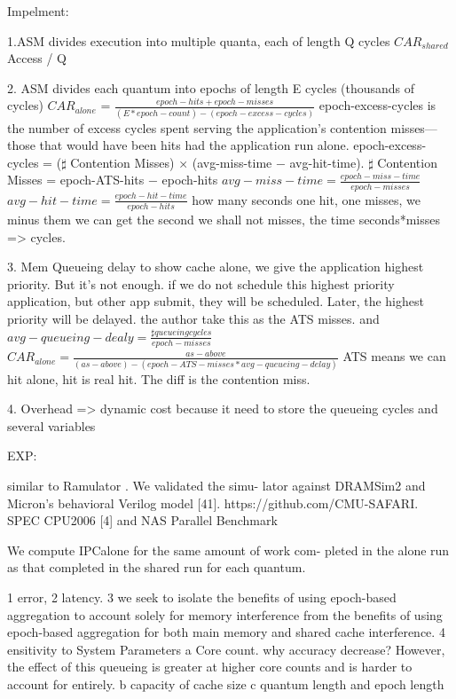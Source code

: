 \documentclass[UTF8]{article}
\begin{document}
Impelment: 

1.ASM divides execution into multiple quanta, each of length Q cycles $ CAR_{shared}$ Access / Q 

2. ASM divides each quantum into epochs of length E cycles (thousands of cycles)  $CAR_{alone}$   = $\frac{epoch-hits + epoch-misses}{(E*epoch-count) - (epoch-excess-cycles)}$   epoch-excess-cycles is the number of excess cycles spent serving the application’s contention misses—those that would have been hits had the application run alone.  epoch-excess-cycles = ($\sharp$ Contention Misses) × (avg-miss-time − avg-hit-time). $\sharp$ Contention Misses = epoch-ATS-hits − epoch-hits $avg-miss-time = \frac{epoch-miss-time}{epoch-misses}$ $avg-hit-time = \frac{epoch-hit-time}{epoch-hits}$ how many seconds one hit, one misses, we minus them we can get the second we shall not misses, the time seconds*misses => cycles. 

3. Mem Queueing delay to show cache alone, we give the application highest priority. But it's not enough. if we do not schedule this highest priority application, but other app submit, they will be scheduled. Later, the highest priority will be delayed. the author take this as the ATS misses. and $avg-queueing-dealy = \frac{\sharp queueing cycles}{epoch-misses}$ $CAR_{alone} = \frac{as-above}{(as-above) - (epoch-ATS-misses*avg-queueing-delay)}$ ATS means we can hit alone, hit is real hit. The diff is the contention miss.

4. Overhead => dynamic cost because it need to store the queueing cycles and several variables

EXP:

similar to Ramulator \cite{kim2015ramulator}. We validated the simu- lator against DRAMSim2 \cite{rosenfeld2011dramsim2} and Micron’s behavioral Verilog model [41]. https://github.com/CMU-SAFARI. SPEC CPU2006 [4] and NAS Parallel Benchmark

We compute IPCalone for the same amount of work com- pleted in the alone run as that completed in the shared run for each quantum.

1 error,  2 latency. 3 we seek to isolate the benefits of using epoch-based aggregation to account solely for memory interference from the benefits of using epoch-based aggregation for both main memory and shared cache interference. 4 ensitivity to System Parameters a Core count. why accuracy decrease? However, the effect of this queueing is greater at higher core counts and is harder to account for entirely. b capacity of cache size c quantum length and epoch length
\end{document}
